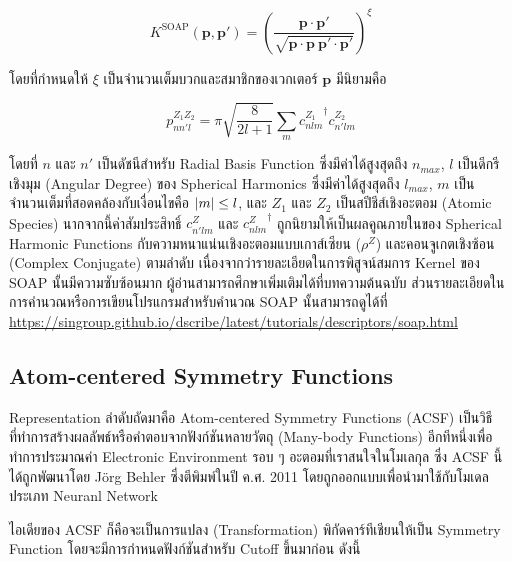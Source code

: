 \begin{equation}
    K^\mathrm{SOAP}(\mathbf{p}, \mathbf{p'}) = \left( \frac{\mathbf{p} \cdot \mathbf{p'}}{\sqrt{\mathbf{p} 
    \cdot \mathbf{p}~\mathbf{p'} \cdot \mathbf{p'}}}\right)^{\xi}
\end{equation}

\noindent โดยที่กำหนดให้ $\xi$ เป็นจำนวนเต็มบวกและสมาชิกของเวกเตอร์ $\mathbf{p}$ มีนิยามคือ 

\begin{equation}
    p^{Z_1 Z_2}_{n n' l} = \pi \sqrt{\frac{8}{2l+1}}\sum_m {c^{Z_1}_{n l m}}^{\dagger} c^{Z_2}_{n' l m}
\end{equation}

\noindent โดยที่ $n$ และ $n'$ เป็นดัชนีสำหรับ Radial Basis Function ซึ่งมีค่าได้สูงสุดถึง $n_{max}$, $l$ เป็นดีกรีเชิงมุม 
(Angular Degree) ของ Spherical Harmonics ซึ่งมีค่าได้สูงสุดถึง $l_{max}$, $m$ เป็นจำนวนเต็มที่สอดคล้องกับเงื่อนไขคือ $\abs{m} \leq l$, 
และ $Z_{1}$ และ $Z_{2}$ เป็นสปีชีส์เชิงอะตอม (Atomic Species) นากจากนี้ค่าสัมประสิทธิ์ $c^{Z}_{n'lm}$ และ ${c^{Z}_{nlm}}^{\dagger}$ 
ถูกนิยามให้เป็นผลคูณภายในของ Spherical Harmonic Functions กับความหนาแน่นเชิงอะตอมแบบเกาส์เซียน ($\rho^Z$) และคอนจูเกตเชิงซ้อน 
(Complex Conjugate) ตามลำดับ\cite{de2016} เนื่องจากว่ารายละเอียดในการพิสูจน์สมการ Kernel ของ SOAP นั้นมีความซับซ้อนมาก
ผู้อ่านสามารถศึกษาเพิ่มเติมได้ที่บทความต้นฉบับ ส่วนรายละเอียดในการคำนวณหรือการเขียนโปรแกรมสำหรับคำนวณ SOAP นั้นสามารถดูได้ที่
\url{https://singroup.github.io/dscribe/latest/tutorials/descriptors/soap.html}

\subsection{Atom-centered Symmetry Functions}

Representation ลำดับถัดมาคือ Atom-centered Symmetry Functions (ACSF) เป็นวิธีที่ทำการสร้างผลลัพธ์หรือคำตอบจากฟังก์ชันหลายวัตถุ
(Many-body Functions) อีกทีหนึ่งเพื่อทำการประมาณค่า Electronic Environment รอบ ๆ อะตอมที่เราสนใจในโมเลกุล
ซึ่ง ACSF นี้ได้ถูกพัฒนาโดย J{\"o}rg Behler ซึ่งตีพิมพ์ในปี ค.ศ. 2011\cite{behler2011} โดยถูกออกแบบเพื่อนำมาใช้กับโมเดลประเภท 
Neuranl Network

ไอเดียของ ACSF ก็คือจะเป็นการแปลง (Transformation) พิกัดคาร์ทีเชียนให้เป็น Symmetry Function โดยจะมีการกำหนดฟังก์ชันสำหรับ 
Cutoff ขึ้นมาก่อน ดังนี้

